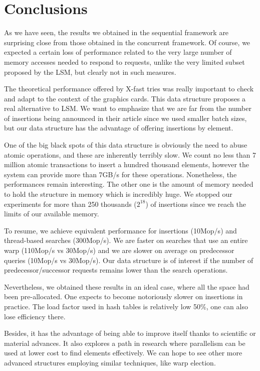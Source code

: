 
\section{Conclusions}

As we have seen, the results we obtained in the sequential framework are surprising close from those obtained in the concurrent framework. Of course, we expected a certain loss of performance related to the very large number of memory accesses needed to respond to requests, unlike the very limited subset proposed by the LSM, but clearly not in such measures.

The theoretical performance offered by X-fast tries was really important to check and adapt to the context of the graphics cards. This data structure proposes a real alternative to LSM. We want to emphasize that we are far from the number of insertions being announced in their article since we used smaller batch sizes, but our data structure has the advantage of offering insertions by element.

One of the big black spots of this data structure is obviously the need to abuse atomic operations, and these are inherently terribly slow. We count no less than 7 million atomic transactions to insert a hundred thousand elements, however the system can provide more than 7GB/s for these operations. Nonetheless, the performances remain interesting. The other one is the amount of memory needed to hold the structure in memory which is incredibly huge. We stopped our experiments for more than 250 thousands ($2^{18}$) of insertions since we reach the limits of our available memory.

To resume, we achieve equivalent performance for insertions (10Mop/s) and thread-based searches (300Mop/s). We are faster on searches that use an entire warp (110Mop/s vs 30Mop/s) and we are slower on average on predecessor queries (10Mop/s vs 30Mop/s). Our data structure is of interest if the number of predecessor/successor requests remains lower than the search operations.

Nevertheless, we obtained these results in an ideal case, where all the space had been pre-allocated. One expects to become notoriously slower on insertions in practice. The load factor used in hash tables is relatively low 50\%, one can also lose efficiency there.

Besides, it has the advantage of being able to improve itself thanks to scientific or material advances. It also explores a path in research where parallelism can be used at lower cost to find elements effectively. We can hope to see other more advanced structures employing similar techniques, like warp election.

